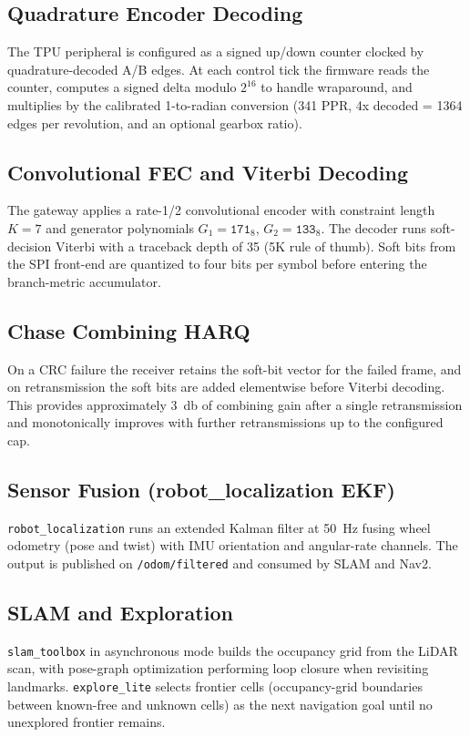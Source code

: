 \documentclass[11pt,letterpaper]{article}
\begin{document}
\subsection{Quadrature Encoder Decoding}
The TPU peripheral is configured as a signed up/down counter clocked
by quadrature-decoded A/B edges. At each control tick the firmware
reads the counter, computes a signed delta modulo $2^{16}$ to handle
wraparound, and multiplies by the calibrated
\qty{1}{}-to-radian conversion (341 PPR, 4x decoded = 1364
edges per revolution, and an optional gearbox ratio).

\subsection{Convolutional FEC and Viterbi Decoding}
The gateway applies a rate-1/2 convolutional encoder with constraint
length $K = 7$ and generator polynomials $G_1 = \texttt{171}_8$,
$G_2 = \texttt{133}_8$. The decoder runs soft-decision Viterbi with a
traceback depth of 35 (5K rule of thumb). Soft bits from the SPI
front-end are quantized to four bits per symbol before entering the
branch-metric accumulator.

\subsection{Chase Combining HARQ}
On a CRC failure the receiver retains the soft-bit vector for the
failed frame, and on retransmission the soft bits are added
elementwise before Viterbi decoding. This provides approximately
\qty{3}{\decibel} of combining gain after a single retransmission
and monotonically improves with further retransmissions up to the
configured cap.

\subsection{Sensor Fusion (robot\_localization EKF)}
\texttt{robot\_localization} runs an extended Kalman filter at
\qty{50}{\hertz} fusing wheel odometry (pose and twist) with IMU
orientation and angular-rate channels. The output is published on
\texttt{/odom/filtered} and consumed by SLAM and Nav2.

\subsection{SLAM and Exploration}
\texttt{slam\_toolbox} in asynchronous mode builds the occupancy grid
from the LiDAR scan, with pose-graph optimization performing loop
closure when revisiting landmarks. \texttt{explore\_lite} selects
frontier cells (occupancy-grid boundaries between known-free and
unknown cells) as the next navigation goal until no unexplored
frontier remains.
\end{document}
